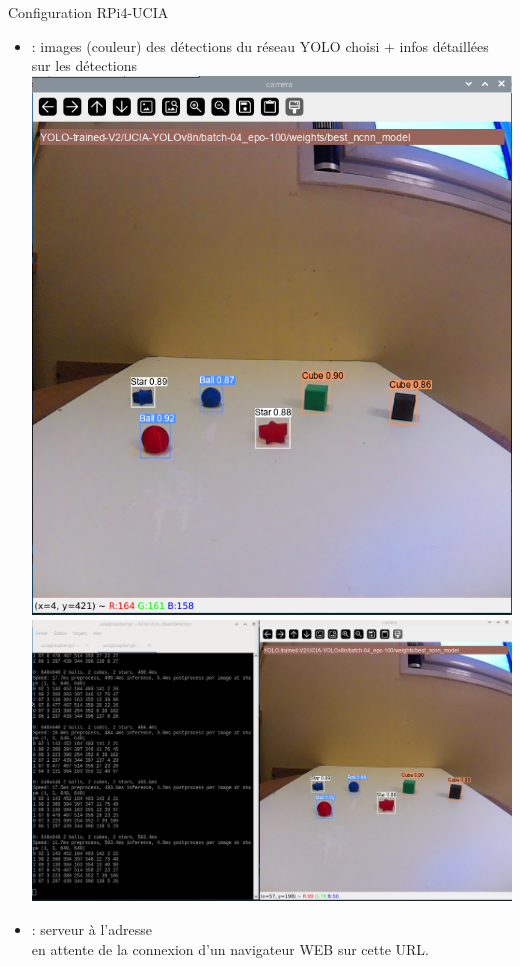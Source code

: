 \documentclass[11pt,serif,mathserif,compress,hyperref={colorlinks}]{beamer}
\begin{document}
\begin{frame}{Configuration RPi4-UCIA}
\begin{tcolorbox}[title={Programmes Python d'exploitation des réseaux YOLO}, add to width=.7cm, height=68mm]
{\begin{itemize}
      \item<5->  : images (couleur) des détections du réseau YOLO choisi 
        + infos détaillées sur les détections\\
         {\vspace*{-4cm}\includegraphics[width=.7\textwidth]{images/detect_camera-2_a.png}}
         {\vspace*{-4cm}\hspace*{-15mm}\includegraphics[width=1.2\textwidth]{images/detect_camera-2_b.png}}
      \item<8->  : serveur à l'adresse \\
        en attente de la connexion d'un navigateur WEB sur cette URL.
        \begin{itemize}

\end{itemize}
\end{itemize}}
\end{tcolorbox}
\end{frame}
\end{document}
